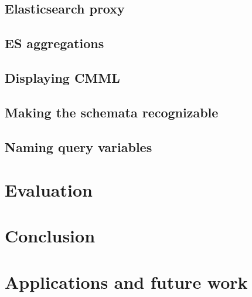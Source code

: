 \documentclass[a4paper,11pt,oneside]{article}
\begin{document}
\subsection{Elasticsearch proxy}\label{subsec:esproxy}
\subsection{ES aggregations}\label{subsec:esagg}
\subsection{Displaying CMML}\label{subsec:displaying_cmml}
\subsection{Making the schemata recognizable}\label{subsec:make_sch_recog}
\subsection{Naming query variables}\label{subsec:naming_qvars}

\section{Evaluation}\label{sec:evaluation}

\section{Conclusion}\label{sec:conclusion}

\section{Applications and future work}\label{sec:future}

\printbibliography
\end{document}
